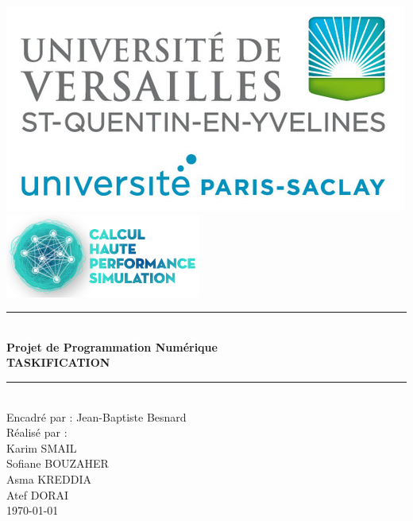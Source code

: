 \documentclass[12pt,titlepage]{article}
\begin{document}

\begin{titlepage}
\newcommand{\HRule}{\rule{\linewidth}{0.1mm}}
\center

\includegraphics[scale=0.4]{logo.png} \\[0.2cm]
\includegraphics[scale=0.7]{CHPS_logo.png} \\[0.2cm]

\HRule \\[0.4cm]
{ \huge \bfseries Projet de Programmation Numérique \\ TASKIFICATION
  \\[0.15cm] }
\HRule \\[1.5cm]
Encadré par : Jean-Baptiste Besnard
\\Réalisé par : \\ Karim SMAIL\\ Sofiane BOUZAHER  \\ Asma  KREDDIA\\ Atef DORAI 
\\[1cm]
\today \\ [1cm]
\end{titlepage}

\end{document}
